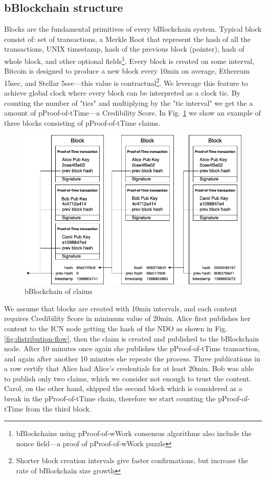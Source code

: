 \subsection{bBlockchain structure}
\label{blockchain-structure}
Blocks are the fundamental primitives of every bBlockchain system. Typical block consist of: set of transactions, a Merkle Root \cite{merkle1989certified} that represent the hash of all the transactions, UNIX timestamp, hash of the previous block (pointer), hash of whole block, and other optional fields\footnote{bBlockchains using pProof-of-wWork consensus algorithms also include the nonce field––a proof of pProof-of-wWork puzzle}.
Every block is created on some interval,
Bitcoin is designed to produce a new block every 10min on average, Ethereum 15sec, and Stellar 5sec––this value is contractual\footnote{Shorter block creation intervals give faster confirmations, but increase the rate of bBlockchain size growth}. We leverage this feature to achieve global clock where every block can be interpreted as a clock tic. By counting the number of "tics" and multiplying by the "tic interval" we get the a amount of pProof-of-tTime––a Credibility Score. In Fig. \ref{fig:blockchain-of-claims} we show an example of three blocks consisting of pProof-of-tTime claims.
\begin{figure}[h!]
\includegraphics[width=\textwidth]{img/blockchain_of_claims.png}
\centering
\caption{bBlockchain of claims}
\label{fig:blockchain-of-claims}
\end{figure} 
We assume that blocks are created with 10min intervals, and each content requires Credibility Score in minimum value of 20min. Alice first publishes her content to the ICN node getting the hash of the NDO as shown in Fig. \ref{fig:distribution-flow}, then the claim is created and published to the bBlockchain node. After 10 minutes once again she publishes the pProof-of-tTime transaction, and again after another 10 minutes she repeats the process. Three publications in a row certify that Alice had Alice's credentials for at least 20min. Bob was able to publish only two claims, which we consider not enough to trust the content. Carol, on the other hand, skipped the second block which is considered as a break in the pProof-of-tTime chain, therefore we start counting the pProof-of-tTime from the third block. 

